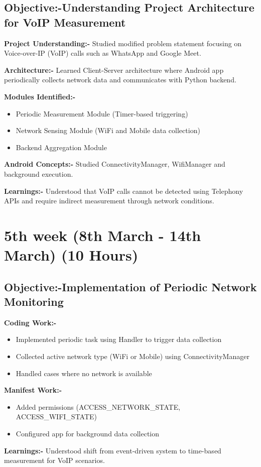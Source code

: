 \documentclass{article}
\begin{document}
\subsection{Objective:-Understanding Project Architecture for VoIP Measurement}
\textbf{Project Understanding:-} Studied modified problem statement focusing on Voice-over-IP (VoIP) calls such as WhatsApp and Google Meet.\par
\vspace{2mm}
\textbf{Architecture:-} Learned Client-Server architecture where Android app periodically collects network data and communicates with Python backend.\par
\vspace{2mm}
\textbf{Modules Identified:-}
\begin{itemize}
\item Periodic Measurement Module (Timer-based triggering)
\item Network Sensing Module (WiFi and Mobile data collection)
\item Backend Aggregation Module
\end{itemize}
\vspace{2mm}
\textbf{Android Concepts:-} Studied ConnectivityManager, WifiManager and background execution.\par
\vspace{2mm}
\textbf{Learnings:-} Understood that VoIP calls cannot be detected using Telephony APIs and require indirect measurement through network conditions.

\section{5th week (8th March - 14th March) (10 Hours)}
\subsection{Objective:-Implementation of Periodic Network Monitoring}
\textbf{Coding Work:-}
\begin{itemize}
\item Implemented periodic task using Handler to trigger data collection
\item Collected active network type (WiFi or Mobile) using ConnectivityManager
\item Handled cases where no network is available
\end{itemize}
\vspace{2mm}
\textbf{Manifest Work:-}
\begin{itemize}
\item Added permissions (ACCESS\_NETWORK\_STATE, ACCESS\_WIFI\_STATE)
\item Configured app for background data collection
\end{itemize}
\vspace{2mm}
\textbf{Learnings:-} Understood shift from event-driven system to time-based measurement for VoIP scenarios.
\end{document}
